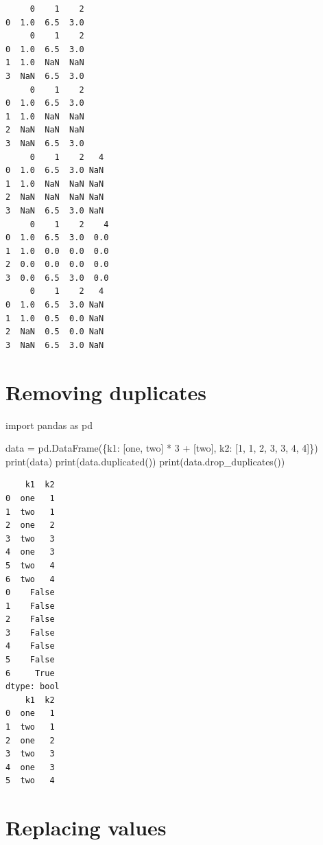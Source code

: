 \documentclass[
  english,
  letterpaper,
  DIV=11,
  numbers=noendperiod]{scrreprt}
\newenvironment{Shaded}{\begin{snugshade}}{\end{snugshade}}
\newcommand{\BuiltInTok}[1]{\textcolor[rgb]{0.00,0.23,0.31}{#1}}
\newcommand{\DecValTok}[1]{\textcolor[rgb]{0.68,0.00,0.00}{#1}}
\newcommand{\ImportTok}[1]{\textcolor[rgb]{0.00,0.46,0.62}{#1}}
\newcommand{\NormalTok}[1]{\textcolor[rgb]{0.00,0.23,0.31}{#1}}
\newcommand{\OperatorTok}[1]{\textcolor[rgb]{0.37,0.37,0.37}{#1}}
\newcommand{\StringTok}[1]{\textcolor[rgb]{0.13,0.47,0.30}{#1}}
\begin{document}
\begin{verbatim}
     0    1    2
0  1.0  6.5  3.0
     0    1    2
0  1.0  6.5  3.0
1  1.0  NaN  NaN
3  NaN  6.5  3.0
     0    1    2
0  1.0  6.5  3.0
1  1.0  NaN  NaN
2  NaN  NaN  NaN
3  NaN  6.5  3.0
     0    1    2   4
0  1.0  6.5  3.0 NaN
1  1.0  NaN  NaN NaN
2  NaN  NaN  NaN NaN
3  NaN  6.5  3.0 NaN
     0    1    2    4
0  1.0  6.5  3.0  0.0
1  1.0  0.0  0.0  0.0
2  0.0  0.0  0.0  0.0
3  0.0  6.5  3.0  0.0
     0    1    2   4
0  1.0  6.5  3.0 NaN
1  1.0  0.5  0.0 NaN
2  NaN  0.5  0.0 NaN
3  NaN  6.5  3.0 NaN
\end{verbatim}

\section{Removing duplicates}\label{removing-duplicates}

\begin{Shaded}
\begin{Highlighting}[]
\ImportTok{import}\NormalTok{ pandas }\ImportTok{as}\NormalTok{ pd}

\NormalTok{data }\OperatorTok{=}\NormalTok{ pd.DataFrame(\{}\StringTok{\textquotesingle{}k1\textquotesingle{}}\NormalTok{: [}\StringTok{\textquotesingle{}one\textquotesingle{}}\NormalTok{, }\StringTok{\textquotesingle{}two\textquotesingle{}}\NormalTok{] }\OperatorTok{*} \DecValTok{3} \OperatorTok{+}\NormalTok{ [}\StringTok{\textquotesingle{}two\textquotesingle{}}\NormalTok{],}
                     \StringTok{\textquotesingle{}k2\textquotesingle{}}\NormalTok{: [}\DecValTok{1}\NormalTok{, }\DecValTok{1}\NormalTok{, }\DecValTok{2}\NormalTok{, }\DecValTok{3}\NormalTok{, }\DecValTok{3}\NormalTok{, }\DecValTok{4}\NormalTok{, }\DecValTok{4}\NormalTok{]\})}
\BuiltInTok{print}\NormalTok{(data)}
\BuiltInTok{print}\NormalTok{(data.duplicated())}
\BuiltInTok{print}\NormalTok{(data.drop\_duplicates())}
\end{Highlighting}
\end{Shaded}

\begin{verbatim}
    k1  k2
0  one   1
1  two   1
2  one   2
3  two   3
4  one   3
5  two   4
6  two   4
0    False
1    False
2    False
3    False
4    False
5    False
6     True
dtype: bool
    k1  k2
0  one   1
1  two   1
2  one   2
3  two   3
4  one   3
5  two   4
\end{verbatim}

\section{Replacing values}\label{replacing-values}
\end{document}
